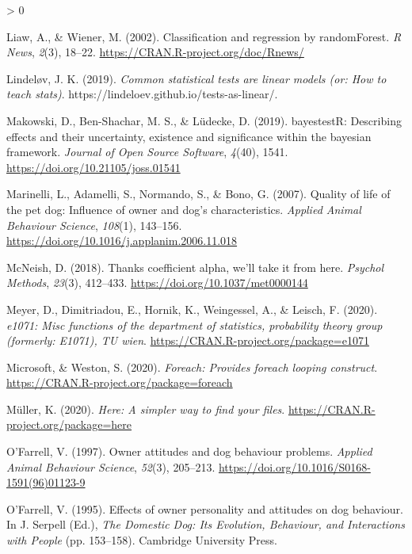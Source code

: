 \documentclass[
  english,
  ,pub,floatsintext]{apa6}
\newlength{\cslhangindent}
\newenvironment{CSLReferences}[2] %
 {%
  \setlength{\parindent}{0pt}
  \ifodd #1 \everypar{\setlength{\hangindent}{\cslhangindent}}\ignorespaces\fi
  \ifnum #2 > 0
  \setlength{\parskip}{#2\baselineskip}
  \fi
 }%
 {}
\begin{document}
\begin{CSLReferences}{1}{0}
\leavevmode\hypertarget{ref-R-randomForest}{}%
Liaw, A., \& Wiener, M. (2002). Classification and regression by randomForest. \emph{R News}, \emph{2}(3), 18--22. \url{https://CRAN.R-project.org/doc/Rnews/}

\leavevmode\hypertarget{ref-Lindelov.2019}{}%
Lindeløv, J. K. (2019). \emph{Common statistical tests are linear models (or: How to teach stats)}. https://lindeloev.github.io/tests-as-linear/.

\leavevmode\hypertarget{ref-R-bayestestR}{}%
Makowski, D., Ben-Shachar, M. S., \& Lüdecke, D. (2019). bayestestR: Describing effects and their uncertainty, existence and significance within the bayesian framework. \emph{Journal of Open Source Software}, \emph{4}(40), 1541. \url{https://doi.org/10.21105/joss.01541}

\leavevmode\hypertarget{ref-Marinelli.etal.2007}{}%
Marinelli, L., Adamelli, S., Normando, S., \& Bono, G. (2007). Quality of life of the pet dog: {Influence} of owner and dog's characteristics. \emph{Applied Animal Behaviour Science}, \emph{108}(1), 143--156. \url{https://doi.org/10.1016/j.applanim.2006.11.018}

\leavevmode\hypertarget{ref-McNeish.2018}{}%
McNeish, D. (2018). Thanks coefficient alpha, we'll take it from here. \emph{Psychol Methods}, \emph{23}(3), 412--433. \url{https://doi.org/10.1037/met0000144}

\leavevmode\hypertarget{ref-R-e1071}{}%
Meyer, D., Dimitriadou, E., Hornik, K., Weingessel, A., \& Leisch, F. (2020). \emph{e1071: Misc functions of the department of statistics, probability theory group (formerly: E1071), TU wien}. \url{https://CRAN.R-project.org/package=e1071}

\leavevmode\hypertarget{ref-R-foreach}{}%
Microsoft, \& Weston, S. (2020). \emph{Foreach: Provides foreach looping construct}. \url{https://CRAN.R-project.org/package=foreach}

\leavevmode\hypertarget{ref-R-here}{}%
Müller, K. (2020). \emph{Here: A simpler way to find your files}. \url{https://CRAN.R-project.org/package=here}

\leavevmode\hypertarget{ref-OFarrell.1997}{}%
O'Farrell, V. (1997). Owner attitudes and dog behaviour problems. \emph{Applied Animal Behaviour Science}, \emph{52}(3), 205--213. \url{https://doi.org/10.1016/S0168-1591(96)01123-9}

\leavevmode\hypertarget{ref-OFarrell.1995}{}%
O'Farrell, V. (1995). Effects of owner personality and attitudes on dog behaviour. In J. Serpell (Ed.), \emph{The {Domestic Dog}: {Its Evolution}, {Behaviour}, and {Interactions} with {People}} (pp. 153--158). {Cambridge University Press}.


\end{CSLReferences}
\end{document}
